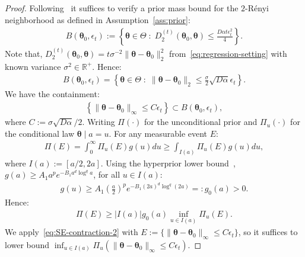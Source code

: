 \documentclass[final,12pt]{colt2026} %
\begin{document}
\begin{proof}
Following~\cite{bhattacharya2019bayesian} it suffices to verify a prior mass bound for the $2$-R\'{e}nyi neighborhood as defined in Assumption~\ref{ass:prior}:
\begin{align*}
    B(\pmb\theta_0, \epsilon_t) := \left\{\pmb\theta \in \Theta\;:\;D_2^{(t)}(\pmb\theta_0, \pmb\theta) \leq \frac{D\alpha t \epsilon_t^2}{4}\right\}.
\end{align*}
Note that, $D_2^{(t)}(\pmb\theta_0, \pmb\theta) = t\sigma^{-2}\lVert \pmb\theta - \pmb\theta_0\rVert_{2}^{2}$ from~\eqref{eq:regression-setting} with known variance $\sigma^{2}\in \mathbb{R}^{+}$. Hence:
\begin{align*}
B(\pmb\theta_0, \epsilon_t) = \left\{\pmb\theta\in \Theta\;:\;\lVert \pmb\theta - \pmb\theta_0\rVert_{2} \leq \frac{\sigma}{2}\sqrt{D\alpha}\epsilon_t\right\}.
\end{align*}
We have the containment:
\begin{align}
\label{eq:SE-contraction-1}
\left\{\lVert \pmb\theta - \pmb\theta_0\rVert_{\infty} \leq C\epsilon_t\right\} \subset B(\pmb\theta_0, \epsilon_t),
\end{align}
where $C:= \sigma \sqrt{D\alpha}/2$. Writing $\Pi(\cdot)$ for the unconditional prior and $\Pi_{u}(\cdot)$ for the conditional law $\pmb\theta\mid a=u$. For any measurable event $E$:
\begin{align*}
\Pi(E) = \int_{0}^{\infty}\Pi_u(E) g(u)du \geq \int_{I(a)}\Pi_u(E)g(u)du,
\end{align*}
where $I(a):= [a/2, 2a]$. Using the hyperprior lower bound~\citep{bhattacharya2019bayesian}, $g(a) \geq A_1 a^p e^{-B_1a^d\log^{q}a}$, for all $u\in I(a)$:
\begin{align*}
g(u) \geq A_1\left(\frac{a}{2}\right)^{p}e^{-B_1(2a)^d\log^{q}(2a)} =: g_0(a) > 0.
\end{align*}
Hence:
\begin{align}
\label{eq:SE-contraction-2}
\Pi(E) \geq |I(a)| g_0(a)\inf_{u\in I(a)}\Pi_u(E).
\end{align}
We apply~\eqref{eq:SE-contraction-2} with $E:= \{\lVert \pmb\theta-\pmb\theta_0\rVert_{\infty} \leq C\epsilon_t\}$, so it suffices to lower bound $\inf_{u\in I(a)}\Pi_u(\lVert \pmb\theta-\pmb\theta_0\rVert_{\infty} \leq C\epsilon_t)$.


\end{proof}
\end{document}
